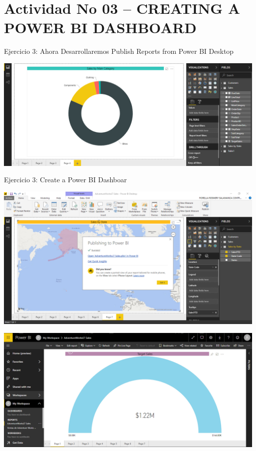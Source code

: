 \section{Actividad No 03 –  CREATING A POWER BI DASHBOARD} 

Ejercicio 3: Ahora Desarrollaremos Publish Reports from Power BI Desktop \\


	

	\begin{center}
	\includegraphics[width=18cm]{./Imagenes/Imagen16}
	\end{center}
\newpage	
Ejercicio 3: Create a Power BI Dashboar \\
	\begin{center}
	\includegraphics[width=18cm]{./Imagenes/Imagen17}
	\end{center}	

	\begin{center}
	\includegraphics[width=18cm]{./Imagenes/Imagen18}
	\end{center}	


